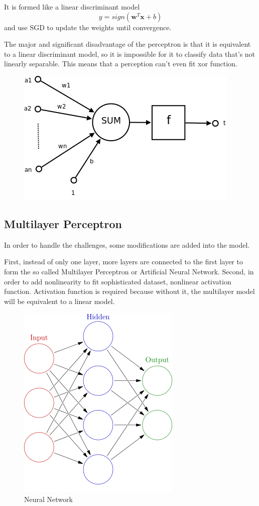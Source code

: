 \documentclass[10pt,twocolumn,letterpaper]{article}
\begin{document}
	It is formed like a linear discriminant model
	\[y = sign(\mathbf{w}^T\mathbf{x} + b)\] and use SGD to update the weights until convergence.
	
	The major and significant disadvantage of the perceptron is that it is equivalent to a linear discriminant model, so it is impossible for it to classify data that's not linearly separable. This means that a perception can't even fit xor function\cite{alpaydin2004introduction}.
	
	\begin{figure}[h]
		\begin{center}
			\includegraphics[width=0.8\linewidth]{images/perceptron.png}
		\end{center}
	\end{figure}
	
\subsection{Multilayer Perceptron}
	In order to handle the challenges, some modifications are added into the model.
	
	First, instead of only one layer, more layers are connected to the first layer to form the so called Multilayer Perceptron or Artificial Neural Network. Second, in order to add nonlinearity to fit sophisticated dataset, nonlinear activation function. Activation function is required because without it, the multilayer model will be equivalent to a linear model\cite{goodfellow_bengio_courville_2017}.
	
	\begin{figure}[h]
		\begin{center}
			\includegraphics[width=0.5\linewidth]{images/ann}
			\caption{Neural Network}
		\end{center}
	\end{figure}
	
\end{document}
